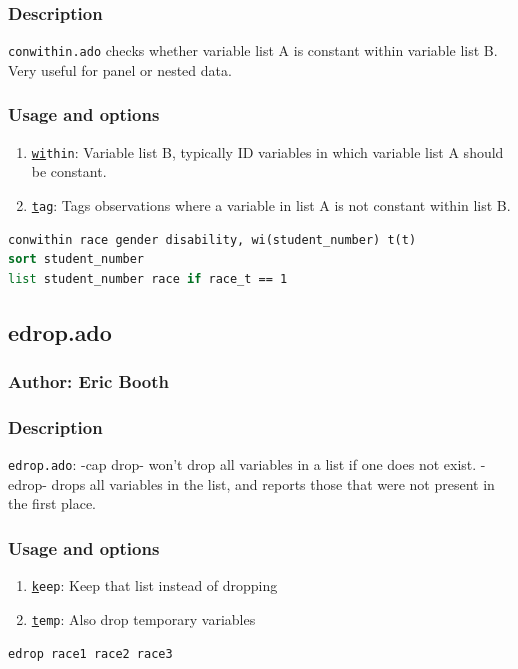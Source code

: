 \documentclass[11pt]{article}
\begin{document}
{\subsubsection{Description}
\texttt{conwithin.ado} checks whether variable list A is constant within variable list B. Very useful for panel or nested data.
\subsubsection{Usage and options}
\begin{enumerate}
\item \texttt{\underline{wi}thin}: Variable list B, typically ID variables in which variable list A should be constant.
\item \texttt{\underline{t}ag}: Tags observations where a variable in list A is not constant within list B.
\end{enumerate}
\begin{lstlisting}[language=Stata, numbers=none]
conwithin race gender disability, wi(student_number) t(t)
sort student_number
list student_number race if race_t == 1
\end{lstlisting}

\subsection{edrop.ado}
\subsubsection{Author: Eric Booth}
\subsubsection{Description}
\texttt{edrop.ado}: -cap drop- won't drop all variables in a list if one does not exist. -edrop- drops all variables in the list, and reports those that were not present in the first place.
\subsubsection{Usage and options}
\begin{enumerate}
\item \texttt{\underline{k}eep}: Keep that list instead of dropping
\item \texttt{\underline{t}emp}: Also drop temporary variables
\end{enumerate}

\begin{lstlisting}[language=Stata, numbers=none]
edrop race1 race2 race3
\end{lstlisting}

}
\end{document}
